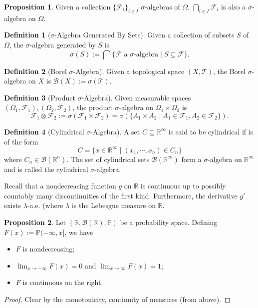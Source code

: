 \documentclass[]{article}
\theoremstyle{definition}
\theoremstyle{definition}
\newtheorem{definition}{Definition}[section]
\newtheorem{proposition}{Proposition}[section]
\begin{document}
\begin{proposition}
  Given a collection \(\{\mathcal{F}_i\}_{i \in I}\) \(\sigma\)-algebras of \(\Omega\),  
  \(\bigcap_{i \in I} \mathcal{F}_i\) is also a \(\sigma\)-algebra on \(\Omega\).
\end{proposition}

\begin{definition}[\(\sigma\)-Algebra Generated By Sets]
  Given a collection of subsets \(S\) of \(\Omega\), the \(\sigma\)-algebra generated 
  by \(S\) is 
  \[\sigma(S) := \bigcap \{\mathcal{F} \text{ a }\sigma\text{-algebra} \mid S \subseteq \mathcal{F}\}.\]
\end{definition}

\begin{definition}[Borel \(\sigma\)-Algebra]
  Given a topological space \((X, \mathcal{T})\), the Borel \(\sigma\)-algebra 
  on \(X\) is \(\mathcal{B}(X) := \sigma(\mathcal{T})\).
\end{definition}

\begin{definition}[Product \(\sigma\)-Algebra]
  Given measurable spaces \((\Omega_1, \mathcal{F}_1), (\Omega_2, \mathcal{F}_2)\), 
  the product \(\sigma\)-algebra on \(\Omega_1 \times \Omega_2\) is 
  \[\mathcal{F}_1 \otimes \mathcal{F}_2 := 
    \sigma(\mathcal{F}_1 \times \mathcal{F}_2) = 
    \sigma(\{A_1 \times A_2 \mid A_1 \in \mathcal{F}_1, A_2 \in \mathcal{F}_2\}).\]
\end{definition}

\begin{definition}[Cylindrical \(\sigma\)-Algebra]
  A set \(C \subseteq \mathbb{R}^\infty\) is said to be cylindrical if is of the 
  form 
  \[C = \{x \in \mathbb{R}^\infty \mid (x_1, \cdots, x_n) \in C_n\}\]
  where \(C_n \in \mathcal{B}(\mathbb{R}^n)\). The set of cylindrical sets 
  \(\mathcal{B}(\mathbb{R}^\infty)\) form 
  a \(\sigma\)-algebra on \(\mathbb{R}^\infty\) and is called the cylindrical 
  \(\sigma\)-algebra.
\end{definition}

Recall that a nondecreasing function \(g\) on \(\mathbb{R}\) is continuous 
up to possibly countably many discontinuities of the first kind. Furthermore, 
the derivative \(g'\) exists \(\lambda\)-a.e. (where \(\lambda\) is the Lebesgue 
measure on \(\mathbb{R}\).

\begin{proposition}
  Let \((\mathbb{R}, \mathcal{B}(\mathbb{R}), \mathbb{P})\) be a probability space. 
  Defining \(F(x) := \mathbb{P}(-\infty, x]\), we have 
  \begin{itemize}
    \item \(F\) is nondecreasing;
    \item \(\lim_{x \to -\infty} F(x) = 0\) and \(\lim_{x \to \infty}F(x) = 1\);
    \item \(F\) is continuous on the right.
  \end{itemize}
\end{proposition}
\begin{proof}
  Clear by the monotonicity, continuity of measures (from above).
\end{proof}
\end{document}
